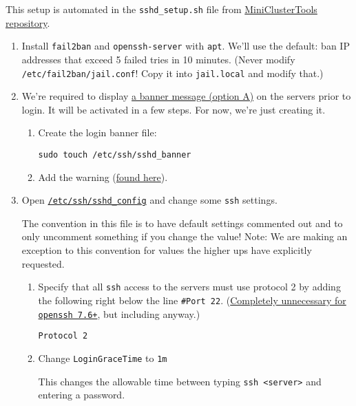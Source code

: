 This setup is automated in the \texttt{sshd\_setup.sh} file from \href{https://github.com/coyleej/MiniClusterTools}{MiniClusterTools repository}. 

\begin{enumerate}
\item Install \texttt{fail2ban} and \texttt{openssh-server} with \texttt{apt}. We'll use the default: ban IP addresses that exceed 5 failed tries in 10 minutes. (Never modify \texttt{/etc/fail2ban/jail.conf}! Copy it into \texttt{jail.local} and modify that.)

\item We're required to display \href{https://www.stigviewer.com/stig/firewall/2015-09-18/finding/V-3013}{a banner message (option A)} on the servers prior to login. It will be activated in a few steps. For now, we're just creating it.

	\begin{enumerate}
		\item Create the login banner file: 

			\texttt{sudo touch /etc/ssh/sshd\_banner}

		\item Add the warning (\href{https://www.stigviewer.com/stig/firewall/2015-09-18/finding/V-3013}{found here}). 
	\end{enumerate}

\item Open \href{https://linux.die.net/man/5/sshd_config}{\texttt{/etc/ssh/sshd\_config}} and change some \texttt{ssh} settings.

	The convention in this file is to have default settings commented out and to only uncomment something if you change the value! Note: We are making an exception to this convention for values the higher ups have explicitly requested.

	\begin{enumerate}
	\item Specify that all \texttt{ssh} access to the servers must use protocol 2 by adding the following right below the line \texttt{\#Port 22}. (\href{https://www.openssh.com/txt/release-7.6}{Completely unnecessary for \texttt{openssh 7.6+}}, but including anyway.)

		\texttt{Protocol 2}

	\item Change \texttt{LoginGraceTime} to \texttt{1m}

	This changes the allowable time between typing \texttt{ssh <server>} and entering a password.


\end{enumerate}
\end{enumerate}
